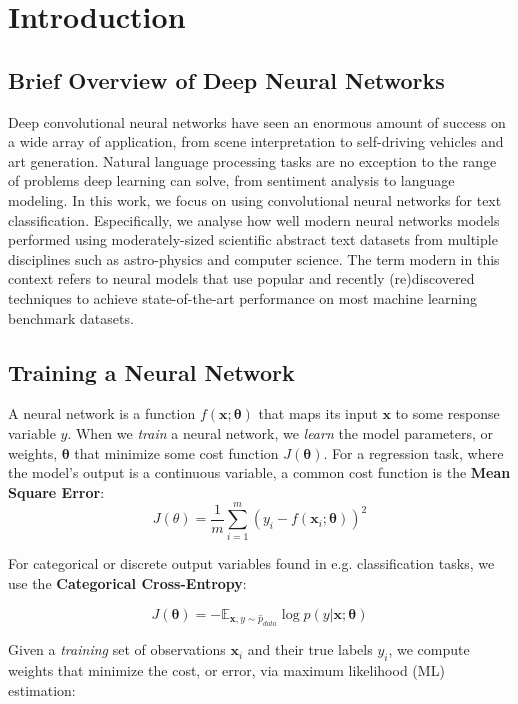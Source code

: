 
\chapter{Introduction}

\section{Brief Overview of Deep Neural Networks}
Deep convolutional neural networks have seen an enormous amount of success on a wide
array of application, from scene interpretation to self-driving vehicles and art generation.
Natural language processing tasks are no exception to the range of problems
deep learning can solve, from sentiment analysis to language modeling. In this work, we
focus on using convolutional neural networks for text classification. Especifically,
we analyse how well modern neural networks models performed using moderately-sized scientific
abstract text datasets from multiple disciplines such as astro-physics and computer science.
The term modern in this context refers to neural models that use popular and recently
(re)discovered techniques to achieve state-of-the-art performance on most machine learning
benchmark datasets.

\section{Training a Neural Network}
A neural network is a function $f(\bm{x};\bm{\theta})$ that maps its input $\bm{x}$ to some response variable $y$. When we \textit{train} a
neural network, we \textit{learn} the model parameters, or weights, $\bm{\theta}$ that minimize some cost function $J(\bm{\theta})$.
For a regression task, where the model's output is a continuous variable, a common cost function is the \textbf{Mean Square Error}:
\[J(\theta) = \frac{1}{m}\sum_{i=1}^{m}(y_{i} - f(\bm{x}_{i};\bm{\theta}))^{2}\]

For categorical or discrete output variables found in e.g. classification tasks, we use the \textbf{Categorical Cross-Entropy}:

\[J(\bm{\theta}) = -\mathbb{E}_{\bm{x},y \sim \hat p_{data}} \log \textit{p}(y|\bm{x};\bm{\theta})\]

Given a \textit{training} set of observations $\bm{x}_i$ and their true labels $y_i$, we compute weights that minimize the cost, or error, via
maximum likelihood (ML) estimation:

